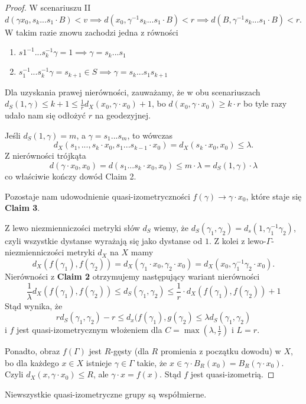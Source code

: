 \begin{proof}
  W scenariuszu II $d(\gamma x_0, s_k...s_1\cdot B)<v\implies d(x_0,\gamma^{-1}s_k...s_1\cdot B)<r\implies d(B, \gamma^{-1}s_k...s_1\cdot B)<r$. W takim razie znowu zachodzi jedna z równości
  \begin{enumerate}
    \item $s1^{-1}...s_k^{-1}\gamma=1\implies \gamma=s_k...s_1$
    \item $s_1^{-1}...s_k^{-1}\gamma=s_{k+1}\in S\implies \gamma=s_k...s_1s_{k+1}$
  \end{enumerate}

  Dla uzyskania prawej nierówności, zauważamy, że w obu scenariuszach 
  $d_S(1,\gamma)\leq k+1\leq \frac{1}{r}d_X(x_0,\gamma\cdot x_0)+1$, bo $d(x_0, \gamma\cdot x_0)\geq k\cdot r$ bo tyle razy udało nam się odłożyć $r$ na geodezyjnej.

  Jeśli $d_S(1,\gamma)=m$, a $\gamma=s_1...s_m$, to wówczas
  $$d_X(s_1,...,s_k\cdot x_0,s_1...s_{k-1}\cdot x_0)=d_X(s_k\cdot x_0,x_0)\leq \lambda.$$
  Z nierówności trójkąta 
  $$d(\gamma\cdot x_0,x_0)=d(s_1...s_k\cdot x_0,x_0)\leq m\cdot \lambda=d_S(1,\gamma)\cdot\lambda$$
  co właściwie kończy dowód Claim 2. 

  Pozostaje nam udowodnienie quasi-izometryczności $f(\gamma)\to \gamma\cdot x_0$, które staje się \textbf{Claim 3}.

  Z lewo niezmienniczości metryki słów $d_S$ wiemy, że $d_S(\gamma_1, \gamma_2)=d_s(1, \gamma_1^{-1}\gamma_2)$, czyli wszystkie dystanse wyrażają się jako dystanse od $1$. Z kolei z lewo-$\Gamma$-niezmienniczości metryki $d_X$ na $X$ mamy 
  $$d_X(f(\gamma_1), f(\gamma_2))=d_X(\gamma_1\cdot x_0,\gamma_2\cdot x_0)=d_X(x_0,\gamma_1^{-1}\gamma_2\cdot x_0).$$
  Nierówności z \textbf{Claim 2} otrzymujemy następujący wariant nierówności
  $$\frac{1}{\lambda}d_X(f(\gamma_1), f(\gamma_2))\leq d_S(\gamma_1,\gamma_2)\leq \frac{1}{r}\cdot d_X(f(\gamma_1), f(\gamma_2))+1$$
  Stąd wynika, że 
  $$r d_S(\gamma_1,\gamma_2)-r\leq d_x(f(\gamma_1),g(\gamma_2)\leq \lambda d_S(\gamma_1,\gamma_2)$$
  i $f$ jest quasi-izometrycznym włożeniem dla $C=\max(\lambda, \frac{1}{r})$ i $L=r$.

  Ponadto, obraz $f(\Gamma)$ jest $R$-gęsty (dla $R$ promienia z początku dowodu) w $X$, bo dla każdego $x\in X$ istnieje $\gamma\in\Gamma$ takie, że $x\in\gamma\cdot B_R(x_0)=B_R(\gamma\cdot x_0)$. Czyli $d_X(x, \gamma\cdot x_0)\leq R$, ale $\gamma\cdot x=f(x)$. Stąd $f$ jest quasi-izometrią.
\end{proof}

Niewszystkie quasi-izometryczne grupy są współmierne.

